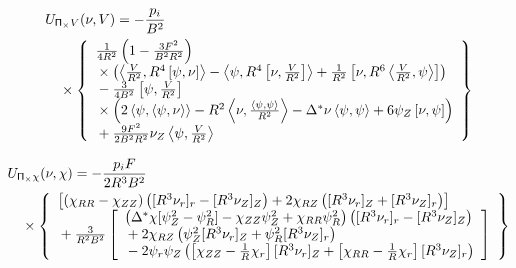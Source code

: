 \begin{eqnarray*}
  & \lefteqn{U_{\P_\times V}(\nu, V) = -\frac{p_i}{B^2}} &
  \\ && \mbox{} \times
  \left\{ \begin{array}{l}
      \frac{1}{4 R^2} \left(1 - \frac{3 F^2}{B^2 R^2} \right) 
      \\ \mbox{} \times
      \left( \ip{\frac{V}{R^2}}{R^4 \pb{\psi}{\nu}}
            -\ip{\psi}{R^4\pb{\nu}{\frac{V}{R^2}}}
	    +\frac{1}{R^2}\pb{\nu}{R^6\ip{\frac{V}{R^2}}{\psi}} \right)
      \\ \mbox{}
      -\frac{3}{4 B^2} \pb{\psi}{\frac{V}{R^2}}
      \\ \mbox{} \times
      \left( 2 \ip{\psi}{\ip{\psi}{\nu}}
           - R^2 \ip{\nu}{\frac{\ip{\psi}{\psi}}{R^2}}
	   - \gs{\nu} \ip{\psi}{\psi}
	   + 6 \psi_Z \pb{\nu}{\psi} \right)
      \\ \mbox{}
      +\frac{9 F^2}{2 B^2 R^2} \nu_Z \ip{\psi}{\frac{V}{R^2}}
    \end{array} \right\}
\end{eqnarray*}

\begin{eqnarray*}
  & \lefteqn{U_{\P_\times \chi}(\nu, \chi) = -\frac{p_i F}{2 R^3 B^2}} &
  \\ && \mbox{} \times 
  \left\{ \begin{array}{l}
    \left[ \left( \chi_{R R} - \chi_{Z Z} \right)
           \left( [R^3 \nu_r]_r - [R^3 \nu_Z]_Z \right)
       +   2 \chi_{R Z} 
           \left( [R^3 \nu_r]_Z + [R^3 \nu_Z]_r \right)
           \right]
    \\ \mbox{}
    + \frac{3}{R^2 B^2} \left[ \begin{array}{l} 
	\left( \gs{\chi}[\psi_Z^2 - \psi_R^2] 
        - \chi_{Z Z} \psi_Z^2 + \chi_{R R} \psi_R^2 \right)
	\left( [R^3 \nu_r]_r - [R^3 \nu_Z]_Z \right)
	\\ \mbox{} + 2 \chi_{R Z} 
	\left( \psi_Z^2 [R^3 \nu_r]_Z
	      +\psi_R^2 [R^3 \nu_Z]_r \right)
	\\ \mbox{} - 2 \psi_r \psi_Z 
	\left( \left[\chi_{Z Z} - \frac{1}{R}\chi_r \right] [R^3 \nu_r]_Z
	      +\left[\chi_{R R} - \frac{1}{R}\chi_r \right][R^3 \nu_Z]_r 
	      \right)
      \end{array} \right]
  \end{array} \right\}
\end{eqnarray*}

